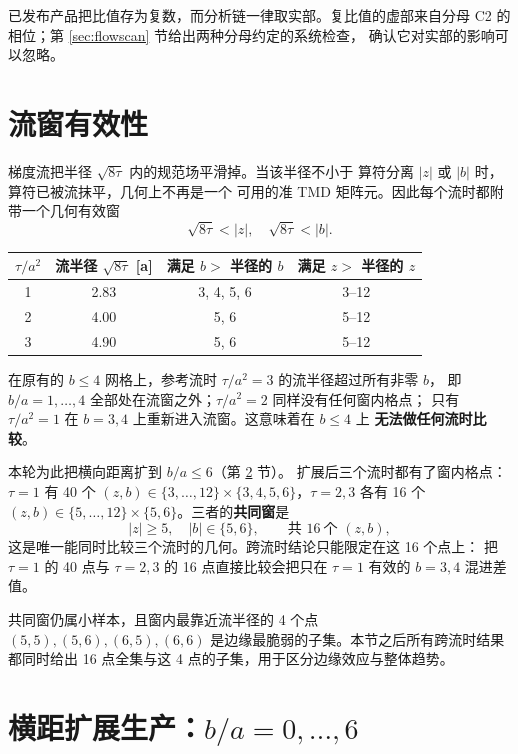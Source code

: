 \documentclass[UTF8,a4paper,11pt]{ctexart}
\begin{document}
已发布产品把比值存为复数，而分析链一律取实部。复比值的虚部来自分母
C2 的相位；第 \ref{sec:flowscan} 节给出两种分母约定的系统检查，
确认它对实部的影响可以忽略。

\section{流窗有效性}
\label{sec:window}

梯度流把半径 $\sqrt{8\tau}$ 内的规范场平滑掉。当该半径不小于
算符分离 $|z|$ 或 $|b|$ 时，算符已被流抹平，几何上不再是一个
可用的准 TMD 矩阵元。因此每个流时都附带一个几何有效窗
\begin{equation}
  \sqrt{8\tau} < |z|,\quad \sqrt{8\tau} < |b|.
\end{equation}

\begin{center}
\begin{tabular}{@{}cccc@{}}
\toprule
$\tau/a^2$ & 流半径 $\sqrt{8\tau}$ [a] & 满足 $b>$ 半径的 $b$ & 满足 $z>$ 半径的 $z$ \\
\midrule
1 & 2.83 & 3, 4, 5, 6 & 3--12 \\
2 & 4.00 & 5, 6 & 5--12 \\
3 & 4.90 & 5, 6 & 5--12 \\
\bottomrule
\end{tabular}
\end{center}

在原有的 $b\le4$ 网格上，参考流时 $\tau/a^2=3$ 的流半径超过所有非零 $b$，
即 $b/a=1,\dots,4$ 全部处在流窗之外；$\tau/a^2=2$ 同样没有任何窗内格点；
只有 $\tau/a^2=1$ 在 $b=3,4$ 上重新进入流窗。这意味着在 $b\le4$ 上
\textbf{无法做任何流时比较}。

本轮为此把横向距离扩到 $b/a\le6$（第 \ref{sec:bext} 节）。
扩展后三个流时都有了窗内格点：$\tau=1$ 有 40 个
$(z,b)\in\{3,\dots,12\}\times\{3,4,5,6\}$，$\tau=2,3$ 各有 16 个
$(z,b)\in\{5,\dots,12\}\times\{5,6\}$。三者的\textbf{共同窗}是
\begin{equation}
  |z|\ge5,\quad |b|\in\{5,6\},\qquad \text{共 }16\ \text{个 }(z,b),
\end{equation}
这是唯一能同时比较三个流时的几何。跨流时结论只能限定在这 16 个点上：
把 $\tau=1$ 的 40 点与 $\tau=2,3$ 的 16 点直接比较会把只在 $\tau=1$
有效的 $b=3,4$ 混进差值。

共同窗仍属小样本，且窗内最靠近流半径的 4 个点
$(5,5),(5,6),(6,5),(6,6)$ 是边缘最脆弱的子集。本节之后所有跨流时结果
都同时给出 16 点全集与这 4 点的子集，用于区分边缘效应与整体趋势。

\section{横距扩展生产：$b/a=0,\dots,6$}
\label{sec:bext}
\end{document}
